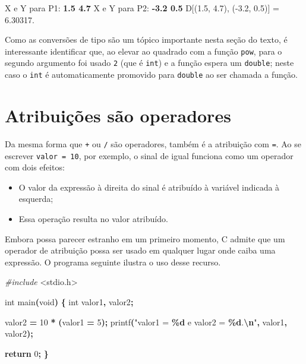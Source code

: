 \documentclass[
  11pt,
  a4paper,
]{scrbook}
\newenvironment{Shaded}{\begin{snugshade}}{\end{snugshade}}
\newcommand{\ControlFlowTok}[1]{\textcolor[rgb]{0.13,0.29,0.53}{\textbf{#1}}}
\newcommand{\DataTypeTok}[1]{\textcolor[rgb]{0.13,0.29,0.53}{#1}}
\newcommand{\DecValTok}[1]{\textcolor[rgb]{0.00,0.00,0.81}{#1}}
\newcommand{\ImportTok}[1]{#1}
\newcommand{\KeywordTok}[1]{\textcolor[rgb]{0.13,0.29,0.53}{\textbf{#1}}}
\newcommand{\NormalTok}[1]{#1}
\newcommand{\OperatorTok}[1]{\textcolor[rgb]{0.81,0.36,0.00}{\textbf{#1}}}
\newcommand{\PreprocessorTok}[1]{\textcolor[rgb]{0.56,0.35,0.01}{\textit{#1}}}
\newcommand{\SpecialCharTok}[1]{\textcolor[rgb]{0.81,0.36,0.00}{\textbf{#1}}}
\newcommand{\StringTok}[1]{\textcolor[rgb]{0.31,0.60,0.02}{#1}}
\providecommand{\tightlist}{%
  \setlength{\itemsep}{0pt}\setlength{\parskip}{0pt}}\usepackage{longtable,booktabs,array}
\begin{document}
\begin{Shaded}
\begin{Highlighting}[]
\NormalTok{X e Y para P1: }\KeywordTok{ 1.5 4.7 }
\NormalTok{X e Y para P2: }\KeywordTok{ {-}3.2 0.5 }
\NormalTok{D[(1.5, 4.7), ({-}3.2, 0.5)] = 6.30317.}
\end{Highlighting}
\end{Shaded}

Como as conversões de tipo são um tópico importante nesta seção do
texto, é interessante identificar que, ao elevar ao quadrado com a
função \texttt{pow}, para o segundo argumento foi usado \texttt{2} (que
é \texttt{int}) e a função espera um \texttt{double}; neste caso o
\texttt{int} é automaticamente promovido para \texttt{double} ao ser
chamada a função.

\section{Atribuições são
operadores}\label{atribuiuxe7uxf5es-suxe3o-operadores}

Da mesma forma que \texttt{+} ou \texttt{/} são operadores, também é a
atribuição com \texttt{=}. Ao se escrever \texttt{valor\ =\ 10}, por
exemplo, o sinal de igual funciona como um operador com dois efeitos:

\begin{itemize}
\tightlist
\item
  O valor da expressão à direita do sinal é atribuído à variável
  indicada à esquerda;
\item
  Essa operação resulta no valor atribuído.
\end{itemize}

Embora possa parecer estranho em um primeiro momento, C admite que um
operador de atribuição possa ser usado em qualquer lugar onde caiba uma
expressão. O programa seguinte ilustra o uso desse recurso.

\begin{Shaded}
\begin{Highlighting}[]
\PreprocessorTok{\#include }\ImportTok{\textless{}stdio.h\textgreater{}}

\DataTypeTok{int}\NormalTok{ main}\OperatorTok{(}\DataTypeTok{void}\OperatorTok{)} \OperatorTok{\{}
    \DataTypeTok{int}\NormalTok{ valor1}\OperatorTok{,}\NormalTok{ valor2}\OperatorTok{;}

\NormalTok{    valor2 }\OperatorTok{=} \DecValTok{10} \OperatorTok{*} \OperatorTok{(}\NormalTok{valor1 }\OperatorTok{=} \DecValTok{5}\OperatorTok{);}
\NormalTok{    printf}\OperatorTok{(}\StringTok{"valor1 = }\SpecialCharTok{\%d}\StringTok{ e valor2 = }\SpecialCharTok{\%d}\StringTok{.}\SpecialCharTok{\textbackslash{}n}\StringTok{"}\OperatorTok{,}\NormalTok{ valor1}\OperatorTok{,}\NormalTok{ valor2}\OperatorTok{);}

    \ControlFlowTok{return} \DecValTok{0}\OperatorTok{;}
\OperatorTok{\}}
\end{Highlighting}
\end{Shaded}
\end{document}
